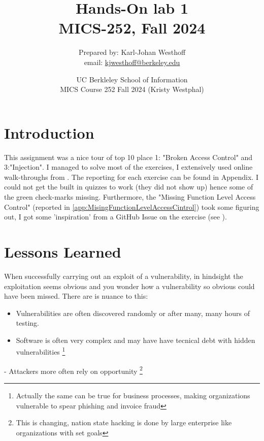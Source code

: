 \documentclass[
	letterpaper, %
	10pt, %
	unnumberedsections, %
	twoside, %
]{APAAssignment}
\title{Hands-On lab 1 \\ MICS-252, Fall 2024} %
\date{UC Berkleley School of Information \\
MICS Course 252 Fall 2024 (Kristy Westphal)
}
\author{
	Prepared by: Karl-Johan Westhoff \\
	email: \href{mailto:kjwesthoff@berkeley.edu}{kjwesthoff@berkeley.edu}
}
\begin{document}
\onecolumn
\maketitle %


\section{Introduction}
This assignment was a nice tour of top 10 place 1: "Broken Access Control" and 3:"Injection". I managed to solve most of the exercises, I extensively used online walk-throughs from \cite{CycubicsDocsWebGoat}. The reporting for each exercise can be found in Appendix. 
I could not get the built in quizzes to work (they did not show up) hence some of the green check-marks missing. Furthermore, the "Missing Function Level Access Control" (reported in \ref{app:MisingFunctionLevelAccessCintrol}) took some figuring out, I got some 'inspiration' from a GitHub Issue on the exercise (see \cite{WebGoatGitHubIssue1424}).

\section{Lessons Learned}
When successfully carrying out an exploit of a vulnerability, in hindsight the exploitation seems obvious and you wonder how a vulnerability so obvious could have been missed. There are is nuance to this: 

\begin{itemize}
	\item{Vulnerabilities are often discovered randomly or after many, many hours of testing.}
	\item{Software is often very complex and may have have tecnical debt with hidden vulnerabilities \footnote{Actually the same can be true for business processes, making organizations vulnerable to spear phishing and invoice fraud}}
\end{itemize}

- Attackers more often rely on opportunity \footnote{This is changing, nation state hacking is done by large enterprise like organizations with set goals}
\end{document}
